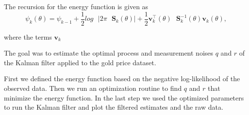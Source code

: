 \begin{theorem}
    The recursion for the energy function is given as 
    \[\psi_k(\theta) = \psi_{k-1} + \frac{1}{2}log\textbf{ }|2\pi\textbf{ 
    }\mathbf{S}_k(\theta)| + \frac{1}{2}\mathbf{v}_k^\intercal(\theta)\textbf{ }\mathbf{S}_k^{-1}(\theta)\mathbf{v}_k(\theta), \]

    where the terms $\mathbf{v}_k$
\end{theorem}


The goal was to estimate the optimal process and measurement noises $q$ and $r$ of the Kalman filter applied to the gold price dataset. 

First we defined the energy function based on the negative log-likelihood of the observed data. Then we run an optimization routine to find $q$ and $r$ that minimize the energy function. In the last step we used the optimized parameters to run the Kalman filter and plot the filtered estimates and the raw data. 

